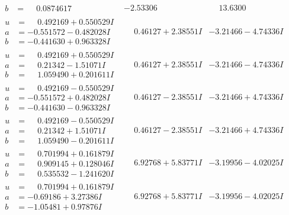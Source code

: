 \documentclass[1p]{elsarticle_modified}
\theoremstyle{definition}
\begin{document}
$$\begin{array}{c|c|c}
\begin{aligned}
b &= \phantom{-}0.0874617\phantom{ +0.000000I}\end{aligned}
 & -2.53306\phantom{ +0.000000I} & \phantom{-}13.6300\phantom{ +0.000000I} \\ \hline\begin{aligned}
u &= \phantom{-}0.492169 + 0.550529 I \\
a &= -0.551572 - 0.482028 I \\
b &= -0.441630 + 0.963328 I\end{aligned}
 & \phantom{-}0.46127 + 2.38551 I & -3.21466 - 4.74336 I \\ \hline\begin{aligned}
u &= \phantom{-}0.492169 + 0.550529 I \\
a &= \phantom{-}0.21342 - 1.51071 I \\
b &= \phantom{-}1.059490 + 0.201611 I\end{aligned}
 & \phantom{-}0.46127 + 2.38551 I & -3.21466 - 4.74336 I \\ \hline\begin{aligned}
u &= \phantom{-}0.492169 - 0.550529 I \\
a &= -0.551572 + 0.482028 I \\
b &= -0.441630 - 0.963328 I\end{aligned}
 & \phantom{-}0.46127 - 2.38551 I & -3.21466 + 4.74336 I \\ \hline\begin{aligned}
u &= \phantom{-}0.492169 - 0.550529 I \\
a &= \phantom{-}0.21342 + 1.51071 I \\
b &= \phantom{-}1.059490 - 0.201611 I\end{aligned}
 & \phantom{-}0.46127 - 2.38551 I & -3.21466 + 4.74336 I \\ \hline\begin{aligned}
u &= \phantom{-}0.701994 + 0.161879 I \\
a &= \phantom{-}0.909145 + 0.128046 I \\
b &= \phantom{-}0.535532 - 1.241620 I\end{aligned}
 & \phantom{-}6.92768 + 5.83771 I & -3.19956 - 4.02025 I \\ \hline\begin{aligned}
u &= \phantom{-}0.701994 + 0.161879 I \\
a &= -0.69186 + 3.27386 I \\
b &= -1.05481 + 0.97876 I\end{aligned}
 & \phantom{-}6.92768 + 5.83771 I & -3.19956 - 4.02025 I \\ \hline\begin{aligned}

\end{aligned}
\end{array}$$
\end{document}
